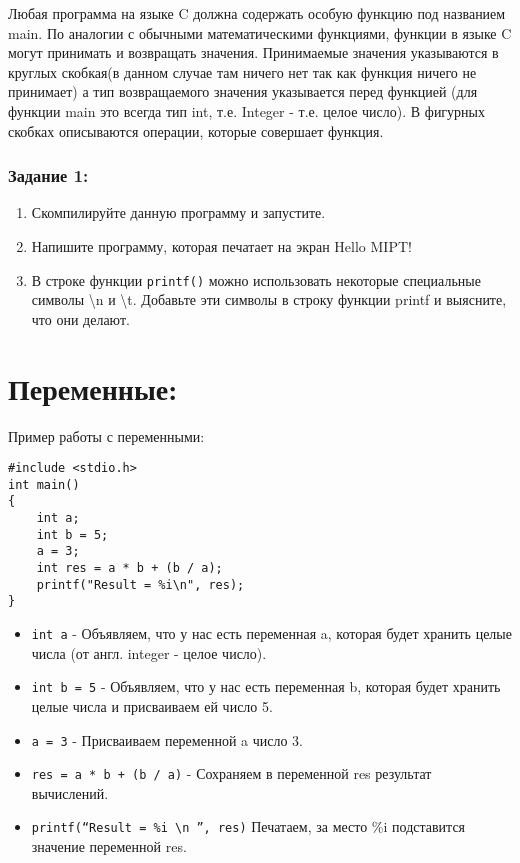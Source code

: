 \documentclass{article}
\begin{document}
Любая программа на языке C должна содержать особую функцию под названием main. По аналогии с обычными математическими функциями, функции в языке C могут принимать и возвращать значения. Принимаемые значения указываются в круглых скобкая(в данном случае там ничего нет так как функция ничего не принимает) а тип возвращаемого значения указывается перед функцией (для функции main это всегда тип int, т.е. Integer - т.е. целое число). В фигурных скобках описываются операции, которые совершает функция. 
\subsubsection*{Задание 1:}
\begin{enumerate}
\item Скомпилируйте данную программу и запустите.
\item Напишите программу, которая печатает на экран Hello MIPT!
\item В строке функции \texttt{printf()} можно использовать некоторые специальные символы \textbackslash n и \textbackslash t. Добавьте эти символы в строку функции printf и выясните, что они делают.
\end{enumerate}

\section*{Переменные:}

Пример работы с переменными:
\begin{lstlisting}
#include <stdio.h>
int main() 
{
    int a;
    int b = 5;
    a = 3;
    int res = a * b + (b / a);
    printf("Result = %i\n", res);
}
\end{lstlisting}

\begin{itemize}
\item \texttt{int a} - Объявляем, что у нас есть переменная a, которая будет хранить целые числа (от англ. integer - целое число).
\item \texttt{int b = 5} - Объявляем, что у нас есть переменная b, которая будет хранить целые числа и присваиваем ей число 5.
\item \texttt{a = 3} - Присваиваем переменной a число 3.
\item \texttt{res = a * b + (b / a)} - Сохраняем в переменной res результат вычислений.
\item \texttt{printf(``Result = \%i \textbackslash n '', res)} Печатаем, за место \%i подставится значение переменной res.
\end{itemize}
\end{document}
